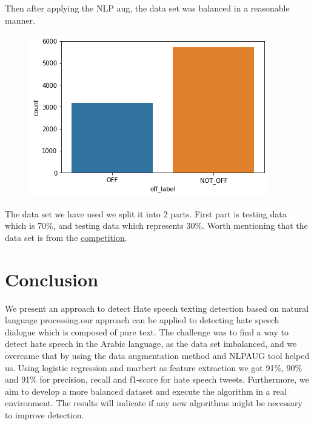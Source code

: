 \documentclass[conference]{IEEEtran}
\begin{document}
Then after applying the NLP aug, the data set was balanced in a reasonable manner.

\begin{figure}[htbp]
	\includegraphics[width=\columnwidth, height=0.22\paperheight]{01.png}
\end{figure}

The data set we have used we split it into 2 parts. First part is testing data which is 70\%, and testing data which represents 30\%. Worth mentioning that the data set is from the \href{https://sites.google.com/view/arabichate2022/home}{competition}.

\section{Conclusion}
We present an approach to detect Hate speech texting detection based on natural language processing.our approach can be applied to detecting hate speech dialogue which is composed of pure text.
The challenge was to find a way to detect hate speech in the Arabic language, as the data set imbalanced, and we overcame that by using the data augmentation method and NLPAUG tool helped us.
Using logistic regression and marbert as feature extraction we got 91\%, 90\% and 91\% for precision, recall and f1-score for hate speech tweets.
Furthermore, we aim to develop a more balanced dataset and execute the algorithm in a real environment. The results will indicate if any new algorithms might be necessary to improve
detection.



%
%



\end{document}
